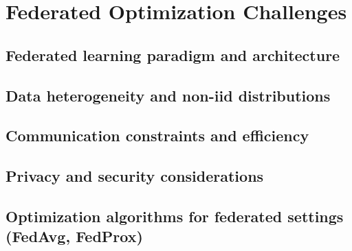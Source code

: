 \section{Federated Optimization Challenges}
\subsection{Federated learning paradigm and architecture}
\subsection{Data heterogeneity and non-iid distributions}
\subsection{Communication constraints and efficiency}
\subsection{Privacy and security considerations}
\subsection{Optimization algorithms for federated settings (FedAvg, FedProx)}

